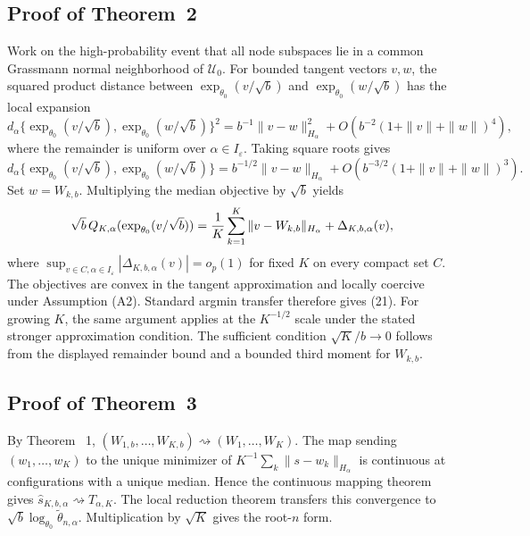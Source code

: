 \documentclass[11pt]{article}
\newcommand{\dto}{\rightsquigarrow}
\newcommand{\U}{\mathcal U}
\newcommand{\eps}{\varepsilon}
\begin{document}
\subsection{Proof of Theorem~2}
Work on the high-probability event that all node subspaces lie in a common Grassmann normal neighborhood of \(\U_0\).  For bounded tangent vectors \(v,w\), the squared product distance between \(\exp_{\theta_0}(v/\sqrt b)\) and \(\exp_{\theta_0}(w/\sqrt b)\) has the local expansion
\[
    d_\alpha\{\exp_{\theta_0}(v/\sqrt b),\exp_{\theta_0}(w/\sqrt b)\}^2
    =b^{-1}\|v-w\|_{H_\alpha}^2+O(b^{-2}(1+\|v\|+\|w\|)^4),
\]
where the remainder is uniform over \(\alpha\in I_\eps\).  Taking square roots gives
\[
    d_\alpha\{\exp_{\theta_0}(v/\sqrt b),\exp_{\theta_0}(w/\sqrt b)\}
    =b^{-1/2}\|v-w\|_{H_\alpha}+O(b^{-3/2}(1+\|v\|+\|w\|)^3).
\]
Set \(w=W_{k,b}\).  Multiplying the median objective by \(\sqrt b\) yields
\[
    \sqrt b\,Q_{K,\alpha}(\exp_{\theta_0}(v/\sqrt b))
    ={1\over K}\sum_{k=1}^K\|v-W_{k,b}\|_{H_\alpha}+\Delta_{K,b,\alpha}(v),
\]
where \(\sup_{v\in C,\alpha\in I_\eps}|\Delta_{K,b,\alpha}(v)|=o_p(1)\) for fixed \(K\) on every compact set \(C\).  The objectives are convex in the tangent approximation and locally coercive under Assumption (A2).  Standard argmin transfer therefore gives (21).  For growing \(K\), the same argument applies at the \(K^{-1/2}\) scale under the stated stronger approximation condition.  The sufficient condition \(\sqrt K/b\to0\) follows from the displayed remainder bound and a bounded third moment for \(W_{k,b}\).

\subsection{Proof of Theorem~3}
By Theorem ~1, \((W_{1,b},\ldots,W_{K,b})\dto(W_1,
\ldots,W_K)\).  The map sending \((w_1,
\ldots,w_K)\) to the unique minimizer of \(K^{-1}\sum_k\|s-w_k\|_{H_\alpha}\) is continuous at configurations with a unique median.  Hence the continuous mapping theorem gives \(\widehat s_{K,b,\alpha}\dto T_{\alpha,K}\).  The local reduction theorem transfers this convergence to \(\sqrt b\log_{\theta_0}\widetilde\theta_{n,\alpha}\).  Multiplication by \(\sqrt K\) gives the root-\(n\) form.
\end{document}
